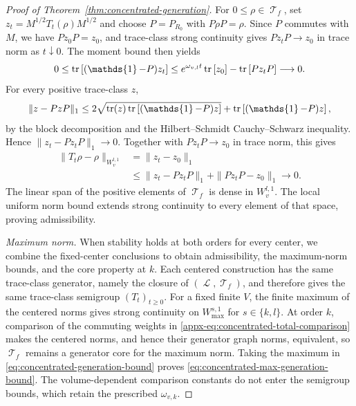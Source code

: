 \documentclass[11pt]{article}
\theoremstyle{myplain}
\theoremstyle{mydefinition}
\theoremstyle{remark}
\DeclareMathOperator{\cL}{\mathcal{L}}
\DeclareMathOperator{\cT}{\mathcal{T}}
\DeclareMathOperator{\1}{\mathds{1}}
\newcommand{\tr}[1][]{\operatorname{tr}%
  \ifx#1\empty \else \left[ #1 \right] \fi}
\begin{document}
\begin{proof}[Proof of Theorem~\ref{thm:concentrated-generation}]
        For $0 \leq \rho \in \cT_f$, set $z_t = M^{1/2}T_t(\rho)M^{1/2}$ and choose $P = P_{R_0}$ with $P\rho P = \rho$. Since $P$ commutes with $M$, we have $Pz_0P = z_0$, and trace-class strong continuity gives $Pz_tP \to z_0$ in trace norm as $t \downarrow 0$. The moment bound then yields
        \begin{equation*}
            0 \leq \tr[(\1 - P)z_t]
            \leq e^{\omega_{v,l}t}\tr[z_0] - \tr[Pz_tP]
            \longrightarrow 0.
        \end{equation*}
        For every positive trace-class $z$,
        \begin{equation*}
            \|z-PzP\|_1
            \leq2\sqrt{\tr(z)\tr[(\1-P)z]}+\tr[(\1-P)z],
        \end{equation*}
        by the block decomposition and the Hilbert--Schmidt Cauchy--Schwarz inequality. Hence $\|z_t-Pz_tP\|_1\to0$. Together with $Pz_tP\to z_0$ in trace norm, this gives
        \begin{equation*}
            \begin{aligned}
                \|T_t\rho-\rho\|_{W_v^{l,1}}
                &=\|z_t-z_0\|_1\\
                &\leq\|z_t-Pz_tP\|_1+\|Pz_tP-z_0\|_1
                \longrightarrow0.
            \end{aligned}
        \end{equation*}
        The linear span of the positive elements of $\cT_f$ is dense in $W_v^{l,1}$. The local uniform norm bound extends strong continuity to every element of that space, proving admissibility.

   

        \emph{Maximum norm.} When stability holds at both orders for every center, we combine the fixed-center conclusions to obtain admissibility, the maximum-norm bounds, and the core property at $k$. Each centered construction has the same trace-class generator, namely the closure of $(\cL,\cT_f)$, and therefore gives the same trace-class semigroup $(T_t)_{t\geq0}$. For a fixed finite $V$, the finite maximum of the centered norms gives strong continuity on $W_{\max}^{s,1}$ for $s\in\{k,l\}$. At order $k$, comparison of the commuting weights in \eqref{appx-eq:concentrated-total-comparison} makes the centered norms, and hence their generator graph norms, equivalent, so $\cT_f$ remains a generator core for the maximum norm. Taking the maximum in \eqref{eq:concentrated-generation-bound} proves \eqref{eq:concentrated-max-generation-bound}. The volume-dependent comparison constants do not enter the semigroup bounds, which retain the prescribed $\omega_{v,k}$.
    \end{proof}
\end{document}
